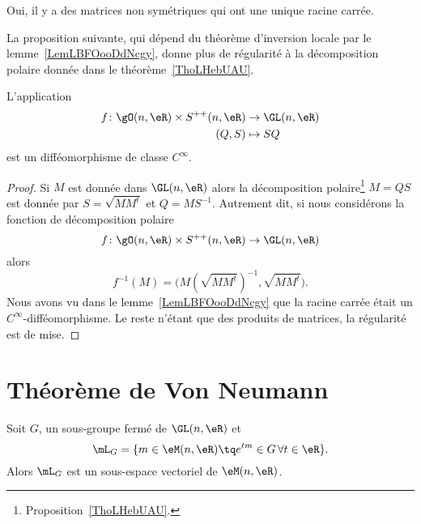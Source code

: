 \begin{remark}
	Oui, il y a des matrices non symétriques qui ont une unique racine carrée.
\end{remark}

La proposition suivante, qui dépend du théorème d'inversion locale par le lemme~\ref{LemLBFOooDdNcgy}, donne plus de régularité à la décomposition polaire donnée dans le théorème~\ref{ThoLHebUAU}.
\begin{proposition}       \label{PropWCXAooDuFMjn}
	L'application
	\begin{equation}
		\begin{aligned}
			f\colon \gO(n,\eR)\times S^{++}(n,\eR) & \to \GL(n,\eR) \\
			(Q,S)                                  & \mapsto SQ
		\end{aligned}
	\end{equation}
	est un difféomorphisme de classe \( C^{\infty}\).
\end{proposition}

\begin{proof}
	Si \( M\) est donnée dans \( \GL(n,\eR)\) alors la décomposition polaire\footnote{Proposition~\ref{ThoLHebUAU}.} \( M=QS\) est donnée par \( S=\sqrt{MM^t}\) et \( Q=MS^{-1}\). Autrement dit, si nous considérons la fonction de décomposition polaire
	\begin{equation}
		f\colon \gO(n,\eR)\times S^{++}(n,\eR)\to \GL(n,\eR)
	\end{equation}
	alors
	\begin{equation}
		f^{-1}(M)=\big(  M(\sqrt{MM^t})^{-1},\sqrt{MM^t}  \big).
	\end{equation}
	Nous avons vu dans le lemme~\ref{LemLBFOooDdNcgy} que la racine carrée était un \( C^{\infty}\)-difféomorphisme. Le reste n'étant que des produits de matrices, la régularité est de mise.
\end{proof}

\section{Théorème de Von Neumann}

\begin{lemma}
	Soit \( G\), un sous-groupe fermé de \( \GL(n,\eR)\) et
	\begin{equation}
		\mL_G=\{ m\in \eM(n,\eR)\tq  e^{tm}\in G\,\forall t\in\eR \}.
	\end{equation}
	Alors \( \mL_G\) est un sous-espace vectoriel de \( \eM(n,\eR)\).
\end{lemma}

